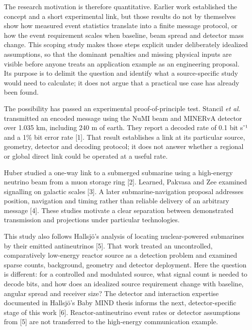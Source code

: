 \documentclass[
]{article}
\begin{document}
The research motivation is therefore quantitative. Earlier work
established the concept and a short experimental link, but those results
do not by themselves show how measured event statistics translate into a
finite message protocol, or how the event requirement scales when
baseline, beam spread and detector mass change. This scoping study makes
those steps explicit under deliberately idealized assumptions, so that
the dominant penalties and missing physical inputs are visible before
anyone treats an application example as an engineering proposal. Its
purpose is to delimit the question and identify what a source-specific
study would need to calculate; it does not argue that a practical use
case has already been found.

The possibility has passed an experimental proof-of-principle test.
Stancil \emph{et al.} transmitted an encoded message using the NuMI beam
and MINERvA detector over 1.035 km, including 240 m of earth. They
report a decoded rate of 0.1 bit s⁻¹ and a 1\% bit error rate {[}1{]}.
That result establishes a link at its particular source, geometry,
detector and decoding protocol; it does not answer whether a regional or
global direct link could be operated at a useful rate.

Huber studied a one-way link to a submerged submarine using a
high-energy neutrino beam from a muon storage ring {[}2{]}. Learned,
Pakvasa and Zee examined signalling on galactic scales {[}3{]}. A later
submarine-navigation proposal addresses position, navigation and timing
rather than reliable delivery of an arbitrary message {[}4{]}. These
studies motivate a clear separation between demonstrated transmission
and projections under particular technologies.

This study also follows Hallsjö's analysis of locating nuclear-powered
submarines by their emitted antineutrinos {[}5{]}. That work treated an
uncontrolled, comparatively low-energy reactor source as a detection
problem and examined sparse counts, background, geometry and detector
deployment. Here the question is different: for a controlled and
modulated source, what signal count is needed to decode bits, and how
does an idealized source requirement change with baseline, angular
spread and receiver size? The detector and interaction expertise
documented in Hallsjö's Baby MIND thesis informs the next,
detector-specific stage of this work {[}6{]}. Reactor-antineutrino event
rates or detector assumptions from {[}5{]} are not transferred to the
high-energy communication example.
\end{document}

